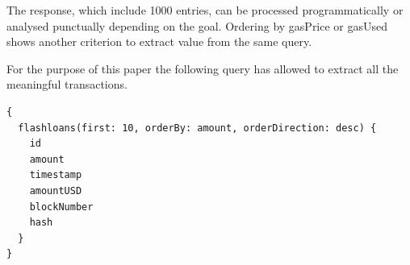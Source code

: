 \documentclass[11pt,a4paper,titlepage]{scrartcl}
\begin{document}
The response, which include 1000 entries, can be processed programmatically or analysed punctually depending on the goal. Ordering by gasPrice or gasUsed shows  another criterion to extract value from the same query.


For the purpose of this paper the following query has allowed to extract all the meaningful transactions.

\begin{lstlisting}[language=xml, caption={ JSON request for top 10  usd amount flashloans }, label={lst:fl_topten}, basicstyle=\ttfamily\scriptsize]
{
  flashloans(first: 10, orderBy: amount, orderDirection: desc) {
    id
    amount
    timestamp
    amountUSD
    blockNumber
    hash
  }
}
\end{lstlisting}
\end{document}
